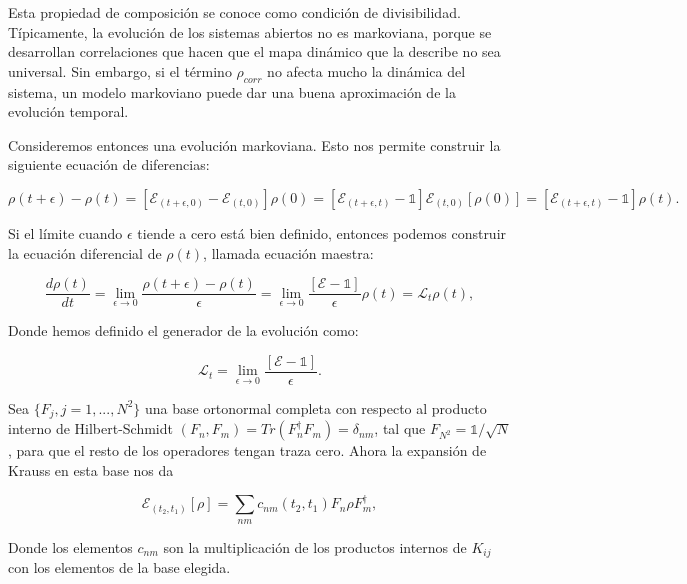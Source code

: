 Esta propiedad de composición se conoce como condición de divisibilidad. Típicamente, la evolución de los sistemas abiertos no es markoviana, porque se desarrollan correlaciones que hacen que el mapa dinámico que la describe no sea universal. Sin embargo, si el término $\rho_{corr}$ no afecta mucho la dinámica del sistema, un modelo markoviano puede dar una buena aproximación de la evolución temporal.

Consideremos entonces una evolución markoviana. Esto nos permite construir la siguiente ecuación de diferencias:

\begin{equation}
    \rho(t + \epsilon) - \rho(t) = [\mathcal{E}_{(t+\epsilon,0)} - \mathcal{E}_{(t,0)}] \rho(0) = [\mathcal{E}_{(t+\epsilon,t)} - \mathds{1}] \mathcal{E}_{(t,0)}[\rho(0)] = [\mathcal{E}_{(t+\epsilon,t)} - \mathds{1}] \rho(t) .
\end{equation}

Si el límite cuando $\epsilon$ tiende a cero está bien definido, entonces podemos construir la ecuación diferencial de $\rho(t)$, llamada ecuación maestra:

\begin{equation}
    \frac{d\rho(t)}{dt} = \lim_{\epsilon \to 0} \frac{\rho(t+\epsilon) - \rho(t)}{\epsilon} = \lim_{\epsilon \to 0} \frac{[\mathcal{E} - \mathds{1}]}{\epsilon} \rho(t) = \mathcal{L}_t \rho(t) ,
\end{equation}

Donde hemos definido el generador de la evolución como:

\begin{equation}
    \mathcal{L}_t = \lim_{\epsilon \to 0} \frac{[\mathcal{E} - \mathds{1}]}{\epsilon} .
\end{equation}

Sea $\{F_j, j = 1, ..., N^2\}$ una base ortonormal completa con respecto al producto interno de Hilbert-Schmidt $(F_n, F_m) = Tr(F_n^\dagger F_m) = \delta_{nm}$, tal que $F_{N^2} = \mathds{1}/\sqrt{N}$, para que el resto de los operadores tengan traza cero. Ahora la expansión de Krauss en esta base nos da

\begin{equation}
    \mathcal{E}_{(t_2, t_1)}[\rho] = \sum_{nm} c_{nm}(t_2, t_1) F_n \rho F_m^\dagger ,
\end{equation}

Donde los elementos $c_{nm}$ son la multiplicación de los productos internos de $K_{ij}$ con los elementos de la base elegida.

